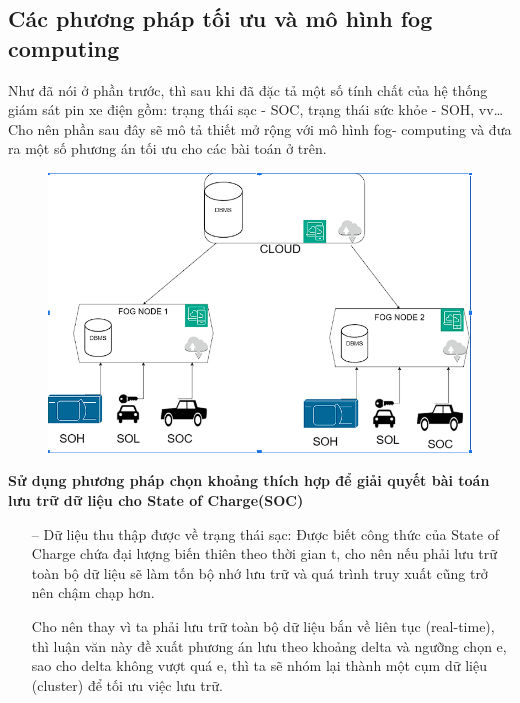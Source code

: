 \documentclass[a4paper,11pt]{article}
\theoremstyle{mytheor}
\begin{document}
\subsection{Các phương pháp tối ưu và mô hình fog computing}
Như đã nói ở phần trước, thì sau khi đã đặc tả một số tính chất của hệ thống giám sát pin xe điện gồm: trạng thái sạc - SOC, trạng thái sức khỏe - SOH, vv… Cho nên phần sau đây sẽ mô tả thiết mở rộng với mô hình fog- computing và đưa ra một số phương án tối ưu cho các bài toán ở trên. 
\vspace{10cm}
\begin{figure}
    \centering
    \includegraphics{fog-computing.png}
    \label{fig:enter-label}
\end{figure}
\vspace{5cm}

\textbf{Sử dụng phương pháp chọn khoảng thích hợp để giải quyết bài toán lưu trữ dữ liệu cho State of Charge(SOC) }
\begin{itemize}
    \item[--] Dữ liệu thu thập được về trạng thái sạc: Được biết công thức của State of Charge chứa đại lượng biến thiên theo thời gian t, cho nên nếu phải lưu trữ toàn bộ dữ liệu sẽ làm tốn bộ nhớ lưu trữ và quá trình truy xuất cũng trở nên chậm chạp hơn. 

    Cho nên thay vì ta phải lưu trữ toàn bộ dữ liệu bắn về liên tục (real-time), thì luận văn này đề xuất phương án lưu theo khoảng delta và ngưỡng chọn e, sao cho delta không vượt quá e, thì ta sẽ nhóm lại thành một cụm dữ liệu (cluster) để tối ưu việc lưu trữ.
    
\end{itemize}
\end{document}
